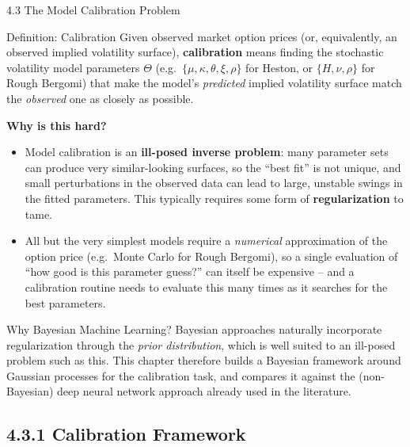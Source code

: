 \documentclass[aspectratio=169,10pt]{beamer}
\begin{document}
\begin{frame}[allowframebreaks]{4.3 The Model Calibration Problem}

\begin{block}{Definition: Calibration}
Given observed market option prices (or, equivalently, an observed implied
volatility surface), \textbf{calibration} means finding the stochastic
volatility model parameters $\Theta$ (e.g.\ $\{\mu,\kappa,\theta,\xi,\rho\}$
for Heston, or $\{H,\nu,\rho\}$ for Rough Bergomi) that make the model's
\emph{predicted} implied volatility surface match the \emph{observed} one
as closely as possible.
\end{block}

\textbf{Why is this hard?}
\begin{itemize}
  \item Model calibration is an \textbf{ill-posed inverse problem}: many
        parameter sets can produce very similar-looking surfaces, so the
        ``best fit'' is not unique, and small perturbations in the
        observed data can lead to large, unstable swings in the fitted
        parameters. This typically requires some form of
        \textbf{regularization} to tame.
  \item All but the very simplest models require a \emph{numerical}
        approximation of the option price (e.g.\ Monte Carlo for Rough
        Bergomi), so a single evaluation of ``how good is this parameter
        guess?'' can itself be expensive -- and a calibration routine
        needs to evaluate this many times as it searches for the best
        parameters.
\end{itemize}

\begin{alertblock}{Why Bayesian Machine Learning?}
Bayesian approaches naturally incorporate regularization through the
\emph{prior distribution}, which is well suited to an ill-posed problem
such as this. This chapter therefore builds a Bayesian framework around
Gaussian processes for the calibration task, and compares it against the
(non-Bayesian) deep neural network approach already used in the
literature.
\end{alertblock}

\end{frame}

\subsection{4.3.1 Calibration Framework}
\end{document}
